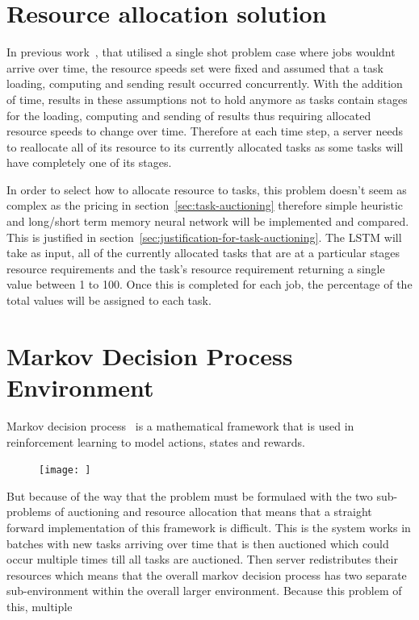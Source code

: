 \section{Resource allocation solution}\label{sec:resource-allocation-solution}
In previous work~\citep{FlexibleResourceAllocation}, that utilised a single shot problem case where jobs wouldnt arrive
over time, the resource speeds set were fixed and assumed that a task loading, computing and sending result
occurred concurrently. With the addition of time, results in these assumptions not to hold anymore as tasks contain
stages for the loading, computing and sending of results thus requiring allocated resource speeds to change over time.
Therefore at each time step, a server needs to reallocate all of its resource to its currently allocated tasks as
some tasks will have completely one of its stages.

In order to select how to allocate resource to tasks, this problem doesn't seem as complex as the pricing in
section~\ref{sec:task-auctioning} therefore simple heuristic and long/short term memory neural network will be
implemented and compared. This is justified in section~\ref{sec:justification-for-task-auctioning}. The LSTM will take as input, all of
the currently allocated tasks that are at a particular stages resource requirements and the task's resource requirement
returning a single value between 1 to 100. Once this is completed for each job, the percentage of the total values will
be assigned to each task.
\section{Markov Decision Process Environment}\label{sec:markov-decision-process-description}
Markov decision process~\citep{} is a mathematical framework that is used in reinforcement learning to model actions,
states and rewards.
\begin{figure}
    \texttt{[image: ]}
    \caption{}
    \label{fig:mdp}
\end{figure}

But because of the way that the problem must be formulaed with the two sub-problems of auctioning and resource
allocation that means that a straight forward implementation of this framework is difficult. This is the system works
in batches with new tasks arriving over time that is then auctioned which could occur multiple times till all tasks
are auctioned. Then server redistributes their resources which means that the overall markov decision process has
two separate sub-environment within the overall larger environment. Because this problem of this, multiple